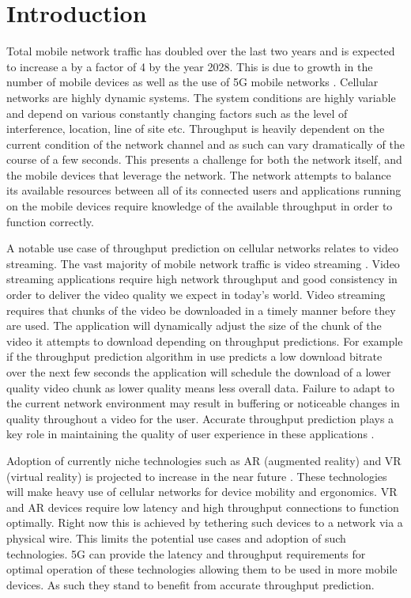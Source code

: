 \chapter{Introduction}
Total mobile network traffic has doubled over the last two years and is expected to increase a by a factor of 4 by the year 2028. This is due to growth in the number of mobile devices as well as the use of 5G mobile networks \cite{Eri22}. Cellular networks are highly dynamic systems. The system conditions are highly variable and depend on various constantly changing factors such as the level of interference, location, line of site etc. Throughput is heavily dependent on the current condition of the network channel and as such can vary dramatically of the course of a few seconds. This presents a challenge for both the network itself, and the mobile devices that leverage the network. The network attempts to balance its available resources between all of its connected users and applications running on the mobile devices require knowledge of the available throughput in order to function correctly. 

A notable use case of throughput prediction on cellular networks relates to video streaming. The vast majority of mobile network traffic is video streaming \cite{Eri22}. Video streaming applications require high network throughput and good consistency in order to deliver the video quality we expect in today's world. Video streaming requires that chunks of the video be downloaded in a timely manner before they are used. The application will dynamically adjust the size of the chunk of the video it attempts to download depending on throughput predictions. For example if the throughput prediction algorithm in use predicts a low download bitrate over the next few seconds the application will schedule the download of a lower quality video chunk as lower quality means less overall data. Failure to adapt to the current network environment may result in buffering or noticeable changes in quality throughout a video for the user. Accurate throughput prediction plays a key role in maintaining the quality of user experience in these applications \cite{raca2019improving}. 

Adoption of currently niche technologies such as AR (augmented reality) and VR (virtual reality) is projected to increase in the near future \cite{Sta22}. These technologies will make heavy use of cellular networks for device mobility and ergonomics. VR and AR devices require low latency and high throughput connections to function optimally. Right now this is achieved by tethering such devices to a network via a physical wire. This limits the potential use cases and adoption of such technologies. 5G can provide the latency and throughput requirements for optimal operation of these technologies allowing them to be used in more mobile devices. As such they stand to benefit from accurate throughput prediction.

